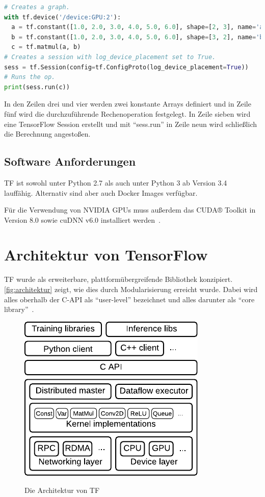 \begin{minipage}{\linewidth}
\begin{lstlisting}[language=Python, label=lst:tf-dev, caption={Festlegung des Geräts, auf dem die Berechnung getätigt werden soll}]
# Creates a graph.
with tf.device('/device:GPU:2'):
  a = tf.constant([1.0, 2.0, 3.0, 4.0, 5.0, 6.0], shape=[2, 3], name='a')
  b = tf.constant([1.0, 2.0, 3.0, 4.0, 5.0, 6.0], shape=[3, 2], name='b')
  c = tf.matmul(a, b)
# Creates a session with log_device_placement set to True.
sess = tf.Session(config=tf.ConfigProto(log_device_placement=True))
# Runs the op.
print(sess.run(c))
\end{lstlisting}
\end{minipage}

In den Zeilen drei und vier werden zwei konstante Arrays definiert und in Zeile fünf wird die durchzuführende Rechenoperation festgelegt. In Zeile sieben wird eine TensorFlow Session erstellt und mit "`sess.run"' in Zeile neun wird schließlich die Berechnung angestoßen.

\subsection{Software Anforderungen}
\Gls{TF} ist sowohl unter Python 2.7 als auch unter Python 3 ab Version 3.4~\cite{tfinstall} lauffähig. Alternativ sind aber auch Docker Images verfügbar.

Für die Verwendung von NVIDIA GPUs muss außerdem das CUDA® Toolkit in Version 8.0 	sowie cuDNN v6.0 installiert werden~\cite{tfinstall}.

\section{Architektur von TensorFlow}
\Gls{TF} wurde als erweiterbare, plattformübergreifende Bibliothek konzipiert. \autoref{fig:architektur} zeigt, wie dies durch Modularisierung erreicht wurde. Dabei wird alles oberhalb der C-API als "`user-level"' bezeichnet und alles darunter als "`core library"'~\cite{tensorflow2016-whitepaper}.

\begin{figure}[htb!]
	\centering
	 \includegraphics[width=.5\textwidth]{images/architektur.pdf}\\
	\vspace{10pt} 
	\caption{Die Architektur von \gls{TF}~\cite{tensorflow2016-whitepaper}}
	\label{fig:architektur}
\end{figure}

